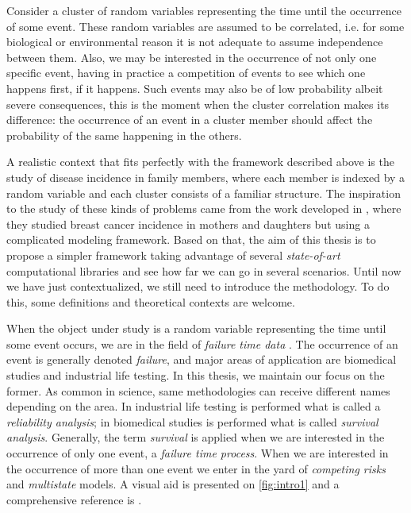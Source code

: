 Consider a cluster of random variables representing the time until the
occurrence of some event. These random variables are assumed to be
correlated, i.e. for some biological or environmental reason it is not
adequate to assume independence between them. Also, we may be interested
in the occurrence of not only one specific event, having in practice a
competition of events to see which one happens first, if it
happens. Such events may also be of low probability albeit severe
consequences, this is the moment when the cluster correlation makes its
difference: the occurrence of an event in a cluster member should affect
the probability of the same happening in the others.

A realistic context that fits perfectly with the framework described
above is the study of disease incidence in family members, where each
member is indexed by a random variable and each cluster consists of a
familiar structure. The inspiration to the study of these kinds of
problems came from the work developed in , where
they studied breast cancer incidence in mothers and daughters but using
a complicated modeling framework. Based on that, the aim of this thesis
is to propose a simpler framework taking advantage of
several \textit{state-of-art} computational libraries and see how far we
can go in several scenarios. Until now we have just contextualized, we
still need to introduce the methodology. To do this, some definitions
and theoretical contexts are welcome.

When the object under study is a random variable representing the time
until some event occurs, we are in the field of \textit{failure time
data} \cite{kalb&prentice}. The occurrence of an event is generally
denoted \textit{failure}, and major areas of application are biomedical
studies and industrial life testing. In this thesis, we maintain our
focus on the former. As common in science, same methodologies can
receive different names depending on the area. In industrial life
testing is performed what is called a \textit{reliability analysis}; in
biomedical studies is performed what is called
\textit{survival analysis}. Generally, the term \textit{survival} is
applied when we are interested in the occurrence of only one event, a
\textit{failure time process}. When we are interested in the occurrence
of more than one event we enter in the yard of \textit{competing risks}
and \textit{multistate} models. A visual aid is presented on
\autoref{fig:intro1} and a comprehensive reference is
.

